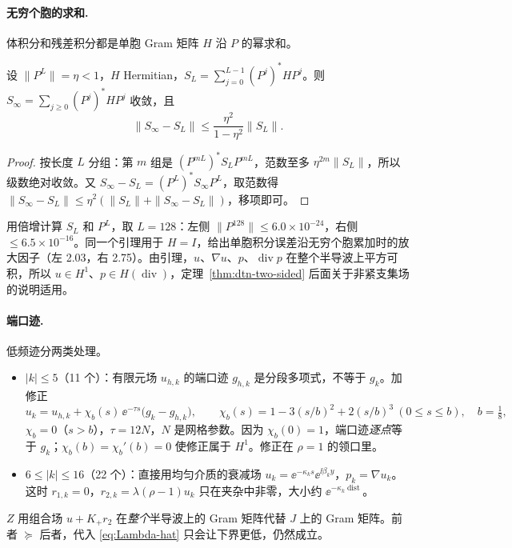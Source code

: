 \documentclass[11pt,a4paper,fontset=fandol]{ctexart}
\begin{document}
\paragraph{无穷个胞的求和.} 体积分和残差积分都是单胞 Gram 矩阵 $H$ 沿 $P$ 的幂求和。

\begin{lemma}[几何级数的尾项]
\label{lem:transfer-tail}
设 $\|P^L\|=\eta<1$，$H$ Hermitian，$S_L=\sum_{j=0}^{L-1}(P^j)^*HP^j$。则 $S_\infty=\sum_{j\ge0}(P^j)^*HP^j$ 收敛，且
\[
\|S_\infty-S_L\|\le\frac{\eta^2}{1-\eta^2}\|S_L\| .
\]
\end{lemma}

\begin{proof}
按长度 $L$ 分组：第 $m$ 组是 $(P^{mL})^*S_LP^{mL}$，范数至多 $\eta^{2m}\|S_L\|$，所以级数绝对收敛。又 $S_\infty-S_L=(P^L)^*S_\infty P^L$，取范数得 $\|S_\infty-S_L\|\le\eta^2(\|S_L\|+\|S_\infty-S_L\|)$，移项即可。
\end{proof}

用倍增计算 $S_L$ 和 $P^L$，取 $L=128$：左侧 $\|P^{128}\|\le6.0\times10^{-24}$，右侧 $\le6.5\times10^{-16}$。同一个引理用于 $H=I$，给出单胞积分误差沿无穷个胞累加时的放大因子（左 2.03，右 2.75）。由引理，$u$、$\nabla u$、$p$、$\operatorname{div}p$ 在整个半导波上平方可积，所以 $u\in H^1$、$p\in H(\operatorname{div})$，定理~\ref{thm:dtn-two-sided} 后面关于非紧支集场的说明适用。

\paragraph{端口迹.} 低频迹分两类处理。
\begin{itemize}
\item $|k|\le5$（11 个）：有限元场 $u_{h,k}$ 的端口迹 $g_{h,k}$ 是分段多项式，不等于 $g_k$。加修正
\[
u_k=u_{h,k}+\chi_b(s)\,\ee^{-\tau s}\bigl(g_k-g_{h,k}\bigr),\qquad \chi_b(s)=1-3(s/b)^2+2(s/b)^3\ (0\le s\le b),\quad b=\tfrac18,
\]
$\chi_b=0$（$s>b$），$\tau=12N$，$N$ 是网格参数。因为 $\chi_b(0)=1$，端口迹\emph{逐点}等于 $g_k$；$\chi_b(b)=\chi_b'(b)=0$ 使修正属于 $H^1$。修正在 $\rho=1$ 的领口里。
\item $6\le|k|\le16$（22 个）：直接用均匀介质的衰减场 $u_k=\ee^{-\kappa_ks}\ee^{\ii\beta_ky}$，$p_k=\nabla u_k$。这时 $r_{1,k}=0$，$r_{2,k}=\lambda(\rho-1)u_k$ 只在夹杂中非零，大小约 $\ee^{-\kappa_k\operatorname{dist}}$。
\end{itemize}
$Z$ 用组合场 $u+K_+r_2$ 在\emph{整个}半导波上的 Gram 矩阵代替 $J$ 上的 Gram 矩阵。前者 $\succeq$ 后者，代入 \eqref{eq:Lambda-hat} 只会让下界更低，仍然成立。
\end{document}
